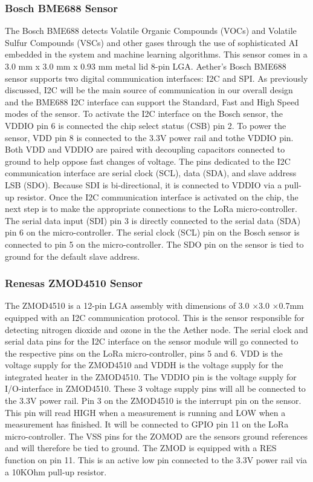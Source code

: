 \subsubsection{Bosch BME688 Sensor}
The Bosch BME688 detects Volatile Organic Compounds (VOCs) and Volatile Sulfur Compounds (VSCs) and other gases through the use of sophisticated AI embedded in the system and machine learning algorithms. This sensor comes in a 3.0 mm x 3.0 mm x 0.93 mm metal lid 8-pin LGA. Aether's Bosch BME688 sensor supports two digital communication interfaces: I2C and SPI. As previously discussed, I2C will be the main source of communication in our overall design and the BME688 I2C interface can support the Standard, Fast and High Speed modes of the sensor. To activate the I2C interface on the Bosch sensor, the VDDIO pin 6 is connected the chip select status (CSB) pin 2. To power the sensor, VDD pin 8 is connected to the 3.3V power rail and tothe VDDIO pin. Both VDD and VDDIO are paired with decoupling capacitors connected to ground to help oppose fast changes of voltage. The pins dedicated to the I2C communication interface are serial clock (SCL), data (SDA), and slave address LSB (SDO). Because SDI is bi-directional, it is connected to VDDIO via a pull-up resistor. Once the I2C communication interface is activated on the chip, the next step is to make the appropriate connections to the LoRa micro-controller. The serial data input (SDI) pin 3 is directly connected to the serial data (SDA) pin 6 on the micro-controller. The serial clock (SCL) pin on the Bosch sensor is connected to pin 5 on the micro-controller. The SDO pin on the sensor is tied to ground for the default slave address.  
\paragraph{}

\subsubsection{Renesas ZMOD4510 Sensor}
The ZMOD4510 is a 12-pin LGA assembly with dimensions of 3.0 ×3.0 ×0.7mm equipped with an I2C communication protocol. This is the sensor responsible for detecting nitrogen dioxide and ozone in the the Aether node. The serial clock and serial data pins for the I2C interface on the sensor module will go connected to the respective pins on the LoRa micro-controller, pins 5 and 6. VDD is the voltage supply for the ZMOD4510 and VDDH is the voltage supply for the integrated heater in the ZMOD4510. The VDDIO pin is the voltage supply for I/O-interface in ZMOD4510. These 3 voltage supply pins will all be connected to the 3.3V power rail. Pin 3 on the ZMOD4510 is the interrupt pin on the sensor. This pin will read HIGH when a measurement is running and LOW when a measurement has finished. It will be connected to GPIO pin 11 on the LoRa micro-controller. The VSS pins for the ZOMOD are the sensors ground references and will therefore be tied to ground. The ZMOD is equipped with a RES function on pin 11. This is an  active low pin connected to the 3.3V power rail via a 10KOhm pull-up resistor. 

